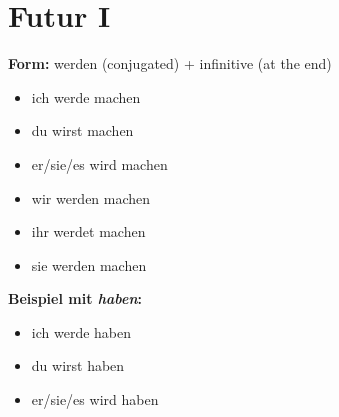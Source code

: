 \section*{Futur I}
    
    \textbf{Form:} werden (conjugated) + infinitive (at the end)
    
    \begin{itemize}
        \item ich werde machen
        \item du wirst machen
        \item er/sie/es wird machen
        \item wir werden machen
        \item ihr werdet machen
        \item sie werden machen
    \end{itemize}
    
    \textbf{Beispiel mit \emph{haben}:}
    
    \begin{itemize}
        \item ich werde haben
        \item du wirst haben
        \item er/sie/es wird haben
    \end{itemize}
